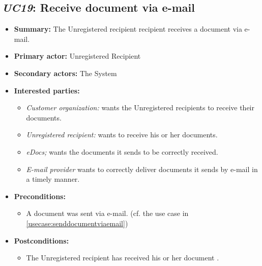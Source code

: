 \documentclass[a4paper,10pt]{article}
\begin{document}
\subsection{\emph{UC19}: Receive document via e-mail}
\begin{itemize}
    \item \textbf{Summary:} The Unregistered recipient recipient receives a document via e-mail.
    \item \textbf{Primary actor:} Unregistered Recipient
	\item \textbf{Secondary actors:} The System
    \item \textbf{Interested parties:} 
        \begin{itemize}
            \item \textit{Customer organization:} wants the Unregistered recipients to receive their documents.
            \item \textit{Unregistered recipient:} wants to receive his or her documents.
            \item \textit{eDocs;} wants the documents it sends to be correctly received.
            \item \textit{E-mail provider} wants to correctly deliver documents it sends by e-mail in a timely manner.
        \end{itemize}

    \item \textbf{Preconditions:}
        \begin{itemize}
            \item A document was sent via e-mail. (cf. the use case in \ref{usecase:senddocumentviaemail})
        \end{itemize}

    \item \textbf{Postconditions:}
        \begin{itemize}
            \item The Unregistered recipient has received his or her document .
        \end{itemize}
        

\end{itemize}
\end{document}
